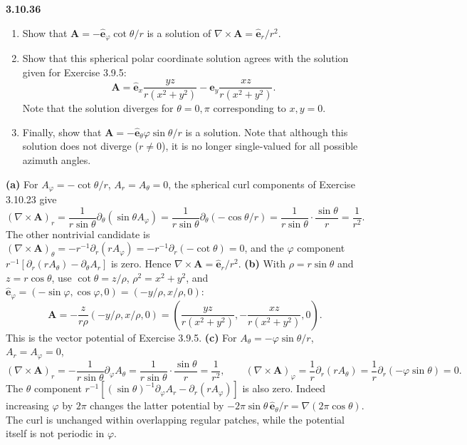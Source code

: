 \par\bigskip
\noindent\textbf{3.10.36}\quad
\begin{enumerate}
\item[(a)] Show that $\mathbf{A}=-\hat{\mathbf{e}}_{\varphi}\cot\theta/r$ is a
  solution of $\nabla\times\mathbf{A}=\hat{\mathbf{e}}_{r}/r^{2}$.
\item[(b)] Show that this spherical polar coordinate solution agrees with the
  solution given for Exercise 3.9.5:
  \[
  \mathbf{A}=\hat{\mathbf{e}}_{x}\frac{yz}{r(x^{2}+y^{2})}
  -\hat{\mathbf{e}}_{y}\frac{xz}{r(x^{2}+y^{2})}.
  \]
  Note that the solution diverges for $\theta=0,\pi$ corresponding to
  $x,y=0$.
\item[(c)] Finally, show that $\mathbf{A}=-\hat{\mathbf{e}}_{\theta}\varphi
  \sin\theta/r$ is a solution. Note that although this solution does not
  diverge ($r\neq0$), it is no longer single-valued for all possible azimuth
  angles.
\end{enumerate}
\solution
\textbf{(a)} For $A_\varphi=-\cot\theta/r$, $A_r=A_\theta=0$, the
spherical curl components of Exercise 3.10.23 give
\[
(\nabla\times\mathbf A)_r
=\frac1{r\sin\theta}\partial_\theta(\sin\theta A_\varphi)
=\frac1{r\sin\theta}\partial_\theta(-\cos\theta/r)
=\frac1{r\sin\theta}\cdot\frac{\sin\theta}r=\frac1{r^2}.
\]
The other nontrivial candidate is
$(\nabla\times\mathbf A)_\theta=-r^{-1}\partial_r(rA_\varphi)
=-r^{-1}\partial_r(-\cot\theta)=0$,
and the $\varphi$ component
$r^{-1}[\partial_r(rA_\theta)-\partial_\theta A_r]$ is zero.
Hence $\nabla\times\mathbf A=\hat{\mathbf e}_r/r^2$.
\textbf{(b)} With $\rho=r\sin\theta$ and $z=r\cos\theta$, use
$\cot\theta=z/\rho$, $\rho^2=x^2+y^2$, and
$\hat{\mathbf e}_\varphi=(-\sin\varphi,\cos\varphi,0)=(-y/\rho,x/\rho,0)$:
\[
\mathbf A=-\frac{z}{r\rho}(-y/\rho,x/\rho,0)
=\left(\frac{yz}{r(x^2+y^2)},-\frac{xz}{r(x^2+y^2)},0\right).
\]
This is the vector potential of Exercise 3.9.5.
\textbf{(c)} For $A_\theta=-\varphi\sin\theta/r$,
$A_r=A_\varphi=0$,
\[
(\nabla\times\mathbf A)_r
=-\frac1{r\sin\theta}\partial_\varphi A_\theta
=\frac1{r\sin\theta}\cdot\frac{\sin\theta}r=\frac1{r^2},
\qquad
(\nabla\times\mathbf A)_\varphi
=\frac1r\partial_r(rA_\theta)=\frac1r\partial_r(-\varphi\sin\theta)=0.
\]
The $\theta$ component
$r^{-1}[(\sin\theta)^{-1}\partial_\varphi A_r-\partial_r(rA_\varphi)]$
is also zero.
Indeed increasing $\varphi$ by $2\pi$ changes the latter potential by
$-2\pi\sin\theta\,\hat{\mathbf e}_\theta/r=\nabla(2\pi\cos\theta)$.
The curl is unchanged within overlapping regular patches, while the
potential itself is not periodic in $\varphi$.

